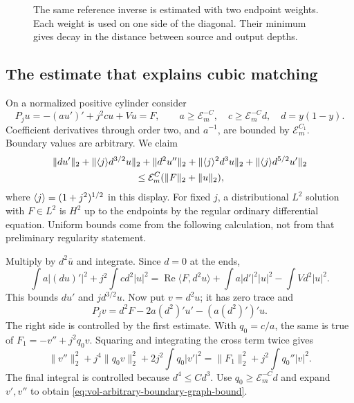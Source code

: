 \begin{figure}[htbp]
\centering
{}
\caption{The same reference inverse is estimated with two endpoint
weights. Each weight is used on one side of the diagonal. Their minimum
gives decay in the distance between source and output depths.}
\label{fig:two-weights}
\end{figure}

\subsection{The estimate that explains cubic matching}

On a normalized positive cylinder consider
\[
 P_ju=-(au')'+j^2cu+Vu=F,
 \qquad a\ge\mathcal E_m^{-C},\quad
 c\ge\mathcal E_m^{-C}d,\quad d=y(1-y).
\]
Coefficient derivatives through order two, and $a^{-1}$, are bounded
by $\mathcal E_m^{C_1}$. Boundary values are arbitrary. We claim
\begin{equation}\label{eq:vol-arbitrary-boundary-graph-bound}
 \begin{split}
 &\|du'\|_2+\|\av j d^{3/2}u\|_2+\|d^2u''\|_2
   +\|\av j^2d^3u\|_2+\|\av j d^{5/2}u'\|_2\\
 &\hspace{30mm}\le\mathcal E_m^C(\|F\|_2+\|u\|_2),
 \end{split}
\end{equation}
where $\langle j\rangle=(1+j^2)^{1/2}$ in this display.
For fixed $j$, a distributional $L^2$ solution with $F\in L^2$
is $H^2$ up to the endpoints by the regular ordinary differential
equation. Uniform bounds come from the following calculation, not
from that preliminary regularity statement.

Multiply by $d^2\bar u$ and integrate. Since $d=0$ at the ends,
\[
 \int a|(du)'|^2+j^2\int cd^2|u|^2
 =\operatorname{Re}\langle F,d^2u\rangle
       +\int a|d'|^2|u|^2-\int Vd^2|u|^2.
\]
This bounds $du'$ and $jd^{3/2}u$. Now put $v=d^2u$; it has
zero trace and
\[
 P_jv=d^2F-2a(d^2)'u'-(a(d^2)')'u.
\]
The right side is controlled by the first estimate. With $q_0=c/a$,
the same is true of $F_1=-v''+j^2q_0v$. Squaring and integrating
the cross term twice gives
\[
 \|v''\|_2^2+j^4\|q_0v\|_2^2+2j^2\int q_0|v'|^2
 =\|F_1\|_2^2+j^2\int q_0''|v|^2.
\]
The final integral is controlled because $d^4\le Cd^3$.
Use $q_0\ge\mathcal E_m^{-C}d$ and expand $v',v''$ to obtain
\eqref{eq:vol-arbitrary-boundary-graph-bound}.

